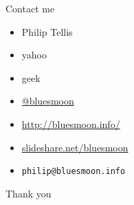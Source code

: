 \documentclass{beamer}
\begin{document}
\begin{frame}{Contact me}
  \begin{itemize}
  \item Philip Tellis
  \item yahoo
  \item geek
  \item \href{http://twitter.com/bluesmoon}{@bluesmoon}
  \item \href{http://bluesmoon.info/}{http://bluesmoon.info/}
  \item \href{http://www.slideshare.net/bluesmoon}{slideshare.net/bluesmoon}
  \item \small{\texttt{philip@bluesmoon.info}}
  \end{itemize}
\end{frame}

\begin{frame}{}
  \begin{center}
  Thank you
  \end{center}
  \parbox[c][.5\paperheight]{\paperwidth}{}
\end{frame}
\end{document}
